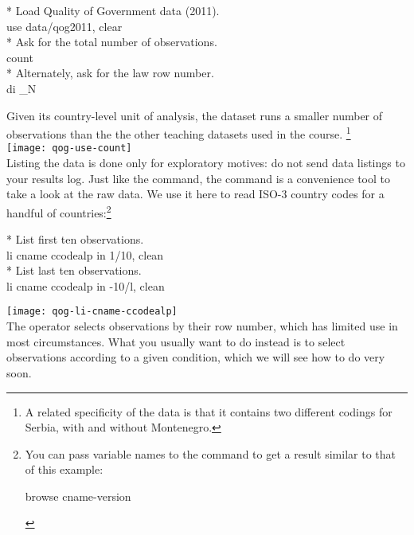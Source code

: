 		\begin{docspec}
			* Load Quality of Government data (2011).\\
			use data/qog2011, clear\\[1em]
	
			* Ask for the total number of observations.\\
			count\\[1em]
	
			* Alternately, ask for the law row number.\\
			di \_N
		\end{docspec}

	Given its country-level unit of analysis, the \QOG dataset runs a smaller number of observations than the the other teaching datasets used in the course.%
		\footnote{A related specificity of the data is that it contains two different codings for Serbia, with and without Montenegro.}\\[1em]%
		
		\texttt{[image: qog-use-count]}\\[1em]

Listing the data is done only for exploratory motives: do not send data listings to your results log. Just like the  command, the  command is a convenience tool to take a look at the raw data. We use it here to read ISO-3 country codes for a handful of countries:\footnote{You can pass variable names to the  command to get a result similar to that of this \QOG example:%
		\begin{docspec}
			browse cname-version
		\end{docspec}}\\[1em]

\begin{docspec}
	* List first ten observations.\\
	li cname ccodealp in 1/10, clean\\[1em]
	
	* List last ten observations.\\
	li cname ccodealp in -10/l, clean
\end{docspec}

\texttt{[image: qog-li-cname-ccodealp]}\\[1em]

The  operator selects observations by their row number, which has limited use in most circumstances.%
	What you usually want to do instead is to select observations according to a given condition, which we will see how to do very soon.

